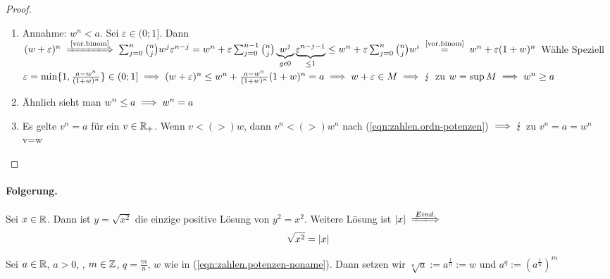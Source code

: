 \documentclass[12pt]{scrreprt}
\begin{document}
\begin{proof}
\begin{enumerate}
\item Annahme: $w^n<a$. Sei $\varepsilon \in (0;1]$. Dann $(w+\varepsilon)^n \folgtnach{\ref{vor.binom}} \sum^n_{j=0}\binom{n}{j}w^j\varepsilon^{n-j}
= w^n+ \varepsilon \sum^{n-1}_{j=0}\binom{n}{j}\underbrace{w^j}_{ge 0}\underbrace{\varepsilon^{n-j-1}}_{\le1}
\le w^n + \varepsilon \sum^n_{j=0}\binom{n}{j}w^i \nach{=}{\ref{vor.binom}} w^n + \varepsilon (1+w)^n$
Wähle Speziell $\varepsilon= \min \{1,\frac{a-w^n}{(1+w)^n}\} \in (0;1] \implies (w+\varepsilon)^n \le w^n +\frac{a-w^n}{(1+w)^n} (1+w)^n=a
\implies w+ \varepsilon \in M \implies \lightning$ zu $w=\sup  M \implies w^n \ge a$
\item Ähnlich sieht man $w^n \le a \implies w^n = a$
\item Es gelte $v^n=a$ für ein $v \in \mathbb{R}_+$. Wenn $v< (>) w$, dann $v^n < (>) w^n$ nach (\ref{eqn:zahlen.ordn-potenzen}) $\implies \lightning$
zu $v^n = a = w^n$ \folgt v=w
\end{enumerate}
\end{proof}

\paragraph{Folgerung.}
Sei $x \in \mathbb{R}$. Dann ist $y = \sqrt{x^2}$ die einzige positive Lösung von $y^2 = x^2$. Weitere Lösung ist $\abs{x} 
\folgtwegen{Eind.}$
\begin{equation}
\sqrt{x^2} = \left\lvert x\right\lvert
\label{eqn:zahlen.betrag-wurzel}
\end{equation}
\begin{dfn}\label{dfn:zahlen.wurzel}
Sei $a \in \mathbb{R}$, $a > 0$, , $m \in \mathbb{Z}$, $q=\frac{m}{n}$, $w$ wie in (\ref{eqn:zahlen.potenzen-noname}).
Dann setzen wir $\sqrt[n]{a} := a^{\frac{1}{n}} := w$ und $a^q:=(a^{\frac{1}{n}})^m$
\end{dfn}
\end{document}
